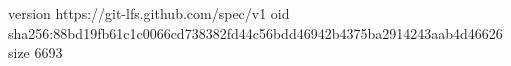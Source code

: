 version https://git-lfs.github.com/spec/v1
oid sha256:88bd19fb61c1c0066cd738382fd44c56bdd46942b4375ba2914243aab4d46626
size 6693
